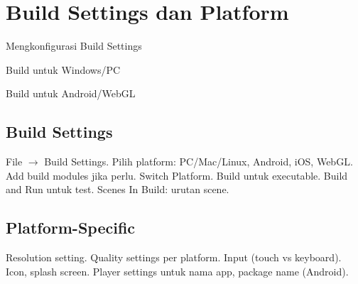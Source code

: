 \section{Build Settings dan Platform}

\begin{learningoutcomes}
\item Mengkonfigurasi Build Settings
\item Build untuk Windows/PC
\item Build untuk Android/WebGL
\end{learningoutcomes}

\subsection{Build Settings}

File $\rightarrow$ Build Settings. Pilih platform: PC/Mac/Linux, Android, iOS, WebGL. Add build modules jika perlu. Switch Platform. Build untuk executable. Build and Run untuk test. Scenes In Build: urutan scene.

\subsection{Platform-Specific}

Resolution setting. Quality settings per platform. Input (touch vs keyboard). Icon, splash screen. Player settings untuk nama app, package name (Android).
